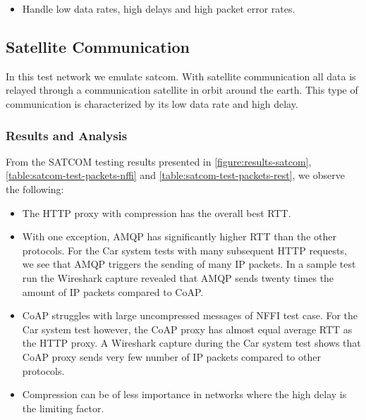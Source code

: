 \begin{itemize}

    \item Handle low data rates, high delays and high packet error rates.

\end{itemize}



\subsection{Satellite Communication}

In this test network we emulate \gls{satcom}. With satellite communication all
data is relayed through a communication satellite in orbit around the earth.
This type of communication is characterized by its low data rate and high delay.

\subsubsection{Results and Analysis}

From the SATCOM testing results presented in \cref{figure:results-satcom},
\cref{table:satcom-test-packets-nffi} and \cref{table:satcom-test-packets-rest},
we observe the following:

\begin{itemize}

    \item The HTTP proxy with compression has the overall best RTT.

    \item With one exception, AMQP has significantly higher RTT than the other
    protocols. For the Car system tests with many subsequent HTTP requests, we
    see that AMQP triggers the sending of many IP packets. In a sample test run
    the Wireshark capture revealed that AMQP sends twenty times the amount of IP
    packets compared to CoAP.

    \item CoAP struggles with large uncompressed messages of NFFI test case. For
    the Car system test however, the CoAP proxy has almost equal average RTT as
    the HTTP proxy. A Wireshark capture during the Car system test shows that
    CoAP proxy sends very few number of IP packets compared to other protocols.

    \item Compression can be of less importance in networks where the high delay
    is the limiting factor.

\end{itemize}

